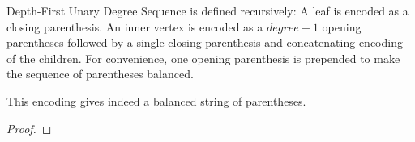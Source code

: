 Depth-First Unary Degree Sequence is defined recursively:
A leaf is encoded as a closing parenthesis.
An inner vertex is encoded as a $degree-1$ opening parentheses followed by a single closing parenthesis and concatenating encoding of the children.
For convenience, one opening parenthesis is prepended to make the sequence of parentheses balanced.

\begin{lemma}
This encoding gives indeed a balanced string of parentheses.
\end{lemma}
\begin{proof}
\end{proof}
